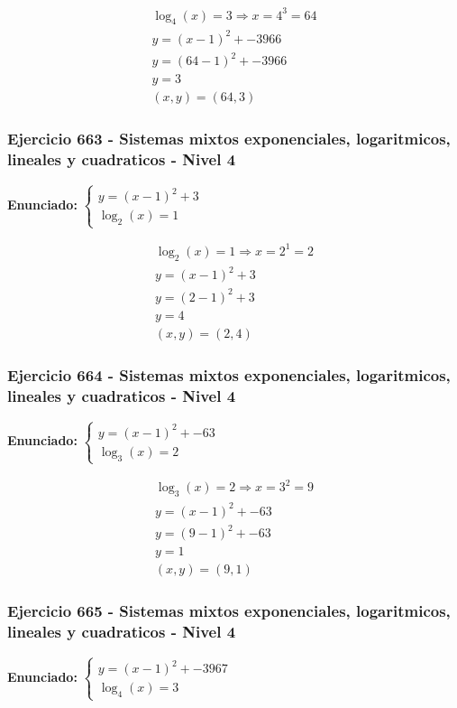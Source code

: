 \documentclass[12pt,a4paper]{article}
\begin{document}
\[
\begin{aligned}
\log_{4}\left(x\right)=3\Rightarrow x=4^{3}=64\\
y=(x-1)^2+-3966\\
y=(64-1)^2+-3966\\
y=3\\
\boxed{(x,y)=(64,3)}
\end{aligned}
\]


\subsubsection*{Ejercicio 663 - Sistemas mixtos exponenciales, logaritmicos, lineales y cuadraticos - Nivel 4}
\textbf{Enunciado:} \(\begin{cases} y=(x-1)^2+3\\ \log_{2}\left(x\right)=1\end{cases}\)

\[
\begin{aligned}
\log_{2}\left(x\right)=1\Rightarrow x=2^{1}=2\\
y=(x-1)^2+3\\
y=(2-1)^2+3\\
y=4\\
\boxed{(x,y)=(2,4)}
\end{aligned}
\]


\subsubsection*{Ejercicio 664 - Sistemas mixtos exponenciales, logaritmicos, lineales y cuadraticos - Nivel 4}
\textbf{Enunciado:} \(\begin{cases} y=(x-1)^2+-63\\ \log_{3}\left(x\right)=2\end{cases}\)

\[
\begin{aligned}
\log_{3}\left(x\right)=2\Rightarrow x=3^{2}=9\\
y=(x-1)^2+-63\\
y=(9-1)^2+-63\\
y=1\\
\boxed{(x,y)=(9,1)}
\end{aligned}
\]


\subsubsection*{Ejercicio 665 - Sistemas mixtos exponenciales, logaritmicos, lineales y cuadraticos - Nivel 4}
\textbf{Enunciado:} \(\begin{cases} y=(x-1)^2+-3967\\ \log_{4}\left(x\right)=3\end{cases}\)
\end{document}

